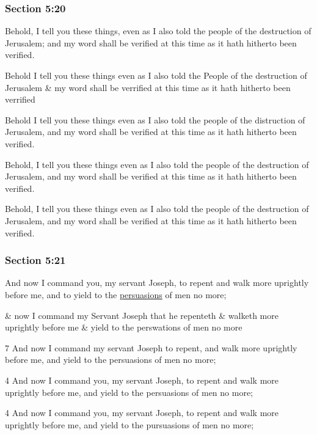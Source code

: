	\subsubsection{Section 5:20} %
		\label{DC5-20}

		Behold, I tell you these things, even as I also told the people of the destruction of Jerusalem; and my word shall be verified at this time as it hath hitherto been verified.

		\begin{framed}
		\scriptsize
			\begin{compactdesc}
				\item[JSP] Behold I tell you these things even as I also told the People of the destruction of Jerusalem \& my word shall be verrified at this time as it hath hitherto been verrified
				\item[RB1] [\textit{missing}]
				\item[BC] Behold I tell you these things even as I also told the people of the distruction of Jerusalem, and my word shall be verified at this time as it hath hitherto been verified.
				\item[DC 1835] Behold, I tell you these things even as I also told the people of the destruction of Jerusalem, and my word shall be verified at this time as it hath hitherto been verified.
				\item[DC 1844] Behold, I tell you these things even as I also told the people of the destruction of Jerusalem, and my word shall be verified at this time as it hath hitherto been verified.
			\end{compactdesc}
		\end{framed}

	\subsubsection{Section 5:21} %
		\label{DC5-21}

		And now I command you, my servant Joseph, to repent and walk more uprightly before me, and to yield to the \hyperref[PERSUASION]{persuasions} of men no more;

		\begin{framed}
		\scriptsize
			\begin{compactdesc}
				\item[JSP] \& now I command my Servant Joseph that he repenteth \& walketh more uprightly before me \& yield to the perswations of men no more
				\item[RB1] [\textit{missing}]
				\item[BC] 7 And now I command my servant Joseph to repent, and walk more uprightly before me, and yield to the persuasions of men no more;
				\item[DC 1835] 4 And now I command you, my servant Joseph, to repent and walk more uprightly before me, and yield to the persuasions of men no more;
				\item[DC 1844] 4 And now I command you, my servant Joseph, to repent and walk more uprightly before me, and yield to the pursuasions of men no more;
			\end{compactdesc}
		\end{framed}

